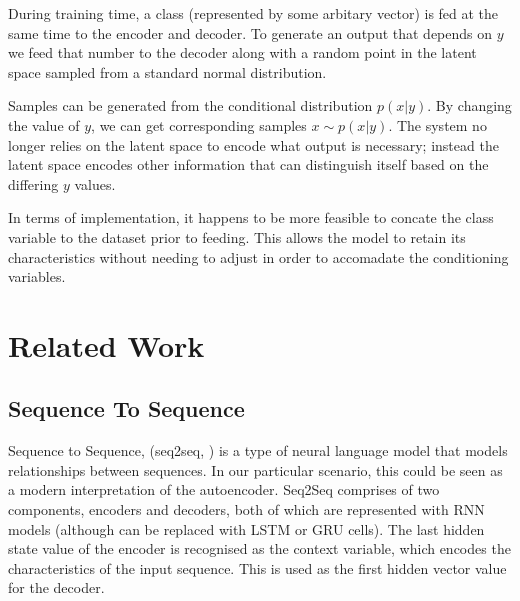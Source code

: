 \documentclass[12pt,twoside]{report}
\begin{document}
During training time, a class (represented by some arbitary vector) is fed at the same time to the encoder and decoder. To generate an output that depends on $y$ we feed that number to the decoder along with a random point in the latent space sampled from a standard normal distribution.

Samples can be generated from the conditional distribution $p(x|y)$. By changing the value of $y$, we can get corresponding samples $x \sim p(x|y)$. The system no longer relies on the latent space to encode what output is necessary; instead the latent space encodes other information that can distinguish itself based on the differing $y$ values.



In terms of implementation, it happens to be more feasible to concate the class variable to the dataset prior to feeding. This allows the model to retain its characteristics without needing to adjust in order to accomadate the conditioning variables.


\section{Related Work}

\subsection{Sequence To Sequence}

Sequence to Sequence, (seq2seq, \cite{sutskever_sequence_2014}) is a type of neural language model that models relationships between sequences. In our particular scenario, this could be seen as a modern interpretation of the autoencoder. Seq2Seq comprises of two components, encoders and decoders, both of which are represented with RNN models (although can be replaced with LSTM or GRU cells). The last hidden state value of the encoder is recognised as the context variable, which encodes the characteristics of the input sequence. This is used as the first hidden vector value for the decoder. 
\end{document}
